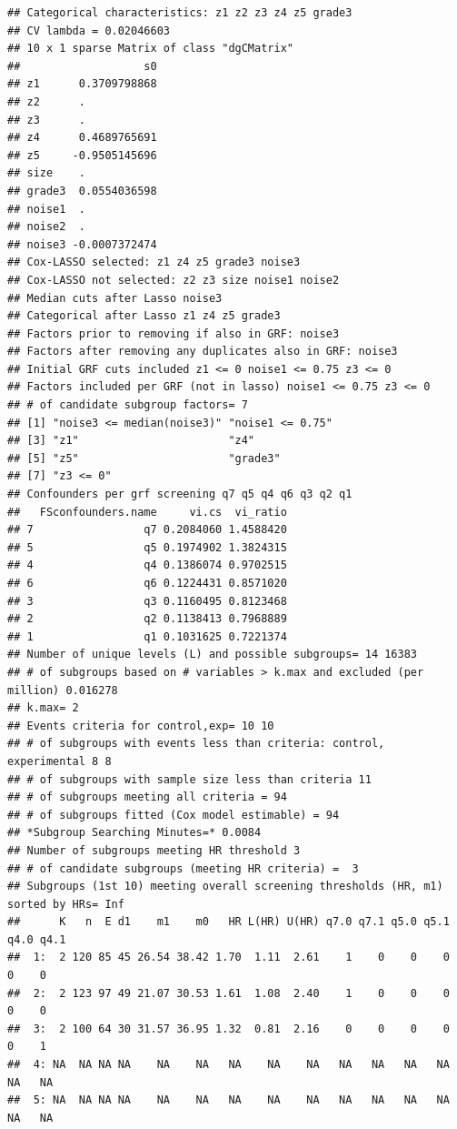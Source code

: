 \documentclass[smallextended]{svjour3}
\makeatletter
\newenvironment{kframe}{%
 \def\at@end@of@kframe{}%
 \ifinner\ifhmode%
  \def\at@end@of@kframe{\end{minipage}}%
  \begin{minipage}{\columnwidth}%
 \fi\fi%
 \def\FrameCommand##1{\hskip\@totalleftmargin \hskip-\fboxsep
 \colorbox{shadecolor}{##1}\hskip-\fboxsep
     \hskip-\linewidth \hskip-\@totalleftmargin \hskip\columnwidth}%
 \MakeFramed {\advance\hsize-\width
   \@totalleftmargin\z@ \linewidth\hsize
   \@setminipage}}%
 {\par\unskip\endMakeFramed%
 \at@end@of@kframe}
\newenvironment{knitrout}{}{} %
\makeatother
\begin{document}
\begin{knitrout}
\begin{kframe}
\begin{verbatim}
## Categorical characteristics: z1 z2 z3 z4 z5 grade3 
## CV lambda = 0.02046603 
## 10 x 1 sparse Matrix of class "dgCMatrix"
##                   s0
## z1      0.3709798868
## z2      .           
## z3      .           
## z4      0.4689765691
## z5     -0.9505145696
## size    .           
## grade3  0.0554036598
## noise1  .           
## noise2  .           
## noise3 -0.0007372474
## Cox-LASSO selected: z1 z4 z5 grade3 noise3 
## Cox-LASSO not selected: z2 z3 size noise1 noise2 
## Median cuts after Lasso noise3 
## Categorical after Lasso z1 z4 z5 grade3 
## Factors prior to removing if also in GRF: noise3 
## Factors after removing any duplicates also in GRF: noise3 
## Initial GRF cuts included z1 <= 0 noise1 <= 0.75 z3 <= 0 
## Factors included per GRF (not in lasso) noise1 <= 0.75 z3 <= 0 
## # of candidate subgroup factors= 7 
## [1] "noise3 <= median(noise3)" "noise1 <= 0.75"          
## [3] "z1"                       "z4"                      
## [5] "z5"                       "grade3"                  
## [7] "z3 <= 0"                 
## Confounders per grf screening q7 q5 q4 q6 q3 q2 q1 
##   FSconfounders.name     vi.cs  vi_ratio
## 7                 q7 0.2084060 1.4588420
## 5                 q5 0.1974902 1.3824315
## 4                 q4 0.1386074 0.9702515
## 6                 q6 0.1224431 0.8571020
## 3                 q3 0.1160495 0.8123468
## 2                 q2 0.1138413 0.7968889
## 1                 q1 0.1031625 0.7221374
## Number of unique levels (L) and possible subgroups= 14 16383 
## # of subgroups based on # variables > k.max and excluded (per million) 0.016278 
## k.max= 2 
## Events criteria for control,exp= 10 10 
## # of subgroups with events less than criteria: control, experimental 8 8 
## # of subgroups with sample size less than criteria 11 
## # of subgroups meeting all criteria = 94 
## # of subgroups fitted (Cox model estimable) = 94 
## *Subgroup Searching Minutes=* 0.0084 
## Number of subgroups meeting HR threshold 3 
## # of candidate subgroups (meeting HR criteria) =  3 
## Subgroups (1st 10) meeting overall screening thresholds (HR, m1) sorted by HRs= Inf 
##      K   n  E d1    m1    m0   HR L(HR) U(HR) q7.0 q7.1 q5.0 q5.1 q4.0 q4.1
##  1:  2 120 85 45 26.54 38.42 1.70  1.11  2.61    1    0    0    0    0    0
##  2:  2 123 97 49 21.07 30.53 1.61  1.08  2.40    1    0    0    0    0    0
##  3:  2 100 64 30 31.57 36.95 1.32  0.81  2.16    0    0    0    0    0    1
##  4: NA  NA NA NA    NA    NA   NA    NA    NA   NA   NA   NA   NA   NA   NA
##  5: NA  NA NA NA    NA    NA   NA    NA    NA   NA   NA   NA   NA   NA   NA

\end{verbatim}
\end{kframe}
\end{knitrout}
\end{document}

